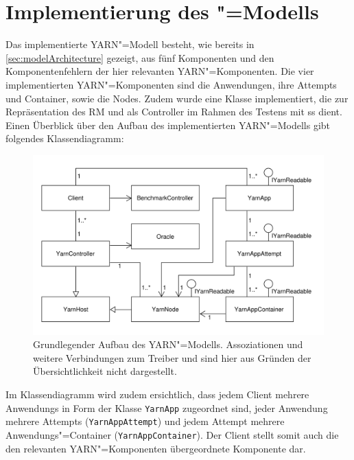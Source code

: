 \section{Implementierung des "=Modells}
\label{sec:yarnModel}

Das implementierte \gls{YARN}"=Modell besteht, wie bereits in \cref{sec:modelArchitecture} gezeigt, aus fünf Komponenten und den Komponentenfehlern der hier relevanten \gls{YARN}"=Komponenten.
Die vier implementierten \gls{YARN}"=Komponenten sind die Anwendungen, ihre \glspl{Attempt} und Container, sowie die Nodes.
Zudem wurde eine Klasse implementiert, die zur Repräsentation des \gls{RM} und als Controller im Rahmen des Testens mit \gls{ss} dient.
Einen Überblick über den Aufbau des implementierten \gls{YARN}"=Modells gibt folgendes Klassendiagramm:

\begin{figure}[h]
    \includegraphics{./resources/yarnModel_ls_MA.pdf}
    \caption[Grundlegender Aufbau des "=Modells]
        {Grundlegender Aufbau des \gls{YARN}"=Modells.
        Assoziationen und weitere Verbindungen zum Treiber und  sind hier aus Gründen der Übersichtlichkeit nicht dargestellt.}
    \label{fig:yarnModelClassDiagram}
\end{figure}

Im Klassendiagramm wird zudem ersichtlich, dass jedem Client mehrere \glspl{Anwendung} in Form der Klasse \texttt{YarnApp} zugeordnet sind, jeder \gls{Anwendung} mehrere \glspl{Attempt} (\texttt{YarnAppAttempt}) und jedem \gls{Attempt} mehrere Anwendungs"=Container (\texttt{YarnAppContainer}).
Der Client stellt somit auch die den relevanten \gls{YARN}"=Komponenten übergeordnete Komponente dar.

